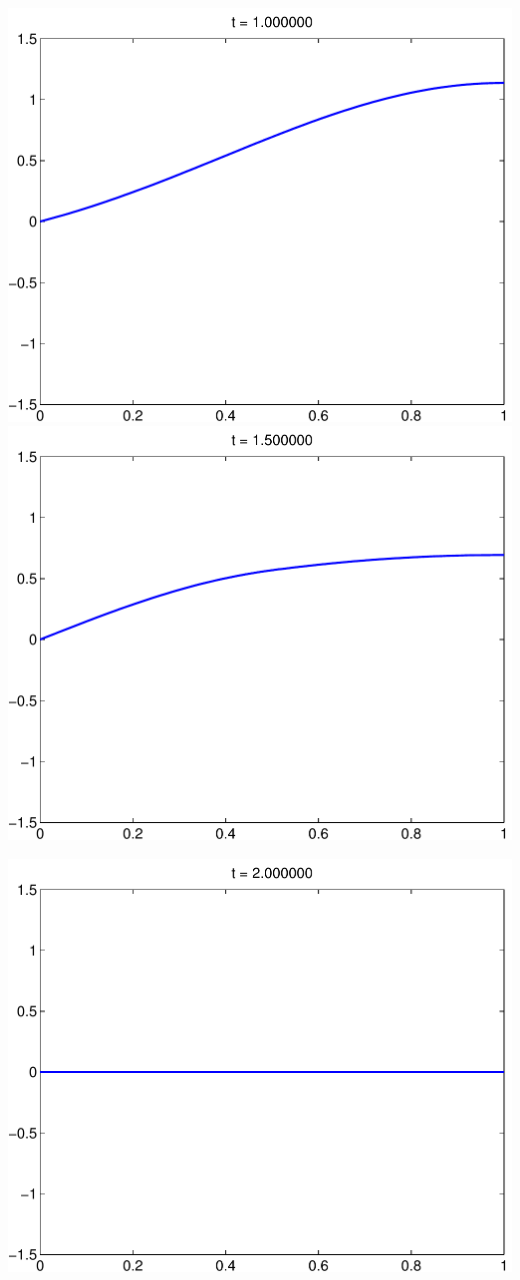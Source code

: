 {\begin{solution}
\begin{enumerate}
\begin{center}
\includegraphics[scale=0.35]{mixed_2}\quad
\includegraphics[scale=0.35]{mixed_3}

\includegraphics[scale=0.35]{mixed_4}
\end{center}


\end{enumerate}
\end{solution}}
